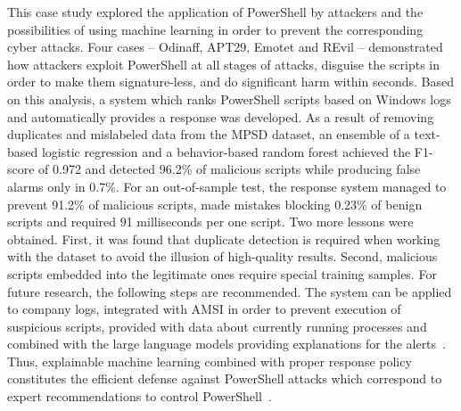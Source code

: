 \documentclass[12pt,a4paper]{article}
\begin{document}
This case study explored the application of PowerShell by attackers and the possibilities of using machine learning in order to prevent the corresponding cyber attacks. Four cases -- Odinaff, APT29, Emotet and REvil -- demonstrated how attackers exploit PowerShell at all stages of attacks, disguise the scripts in order to make them signature-less, and do significant harm within seconds. Based on this analysis, a system which ranks PowerShell scripts based on Windows logs and automatically provides a response was developed. As a result of removing duplicates and mislabeled data from the MPSD dataset, an ensemble of a text-based logistic regression and a behavior-based random forest achieved the F1-score of 0.972 and detected 96.2\% of malicious scripts while producing false alarms only in 0.7\%. For an out-of-sample test, the response system managed to prevent 91.2\% of malicious scripts, made mistakes blocking 0.23\% of benign scripts and required 91 milliseconds per one script. Two more lessons were obtained. First, it was found that duplicate detection is required when working with the dataset to avoid the illusion of high-quality results. Second, malicious scripts embedded into the legitimate ones require special training samples. For future research, the following steps are recommended. The system can be applied to company logs, integrated with AMSI in order to prevent execution of suspicious scripts, provided with data about currently running processes and combined with the large language models providing explanations for the alerts~\cite{wang2026}. Thus, explainable machine learning combined with proper response policy constitutes the efficient defense against PowerShell attacks which correspond to expert recommendations to control PowerShell~\cite{nsa2022}.
\end{document}
